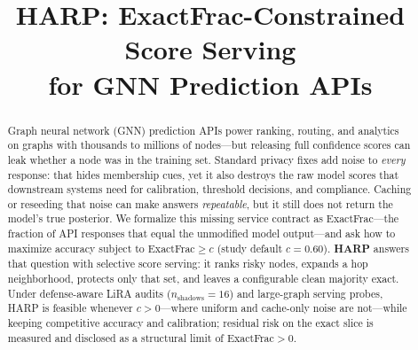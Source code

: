 \documentclass[conference]{IEEEtran}
\begin{document}
\title{HARP: ExactFrac-Constrained Score Serving\\
for GNN Prediction APIs}

\author{
\and
{}
}

\maketitle

\begin{abstract}
Graph neural network (GNN) prediction APIs power ranking, routing, and analytics on graphs with thousands to millions of nodes---but releasing full confidence scores can leak whether a node was in the training set.
Standard privacy fixes add noise to \emph{every} response: that hides membership cues, yet it also destroys the raw model scores that downstream systems need for calibration, threshold decisions, and compliance.
Caching or reseeding that noise can make answers \emph{repeatable}, but it still does not return the model's true posterior.
We formalize this missing service contract as ExactFrac---the fraction of API responses that equal the unmodified model output---and ask how to maximize accuracy subject to ExactFrac$\ge c$ (study default $c{=}0.60$).
\textbf{HARP} answers that question with selective score serving: it ranks risky nodes, expands a hop neighborhood, protects only that set, and leaves a configurable clean majority exact.
Under defense-aware LiRA audits ($n_{\mathrm{shadows}}{=}16$) and large-graph serving probes, HARP is feasible whenever $c{>}0$---where uniform and cache-only noise are not---while keeping competitive accuracy and calibration; residual risk on the exact slice is measured and disclosed as a structural limit of ExactFrac$>0$.
\end{abstract}
\end{document}
